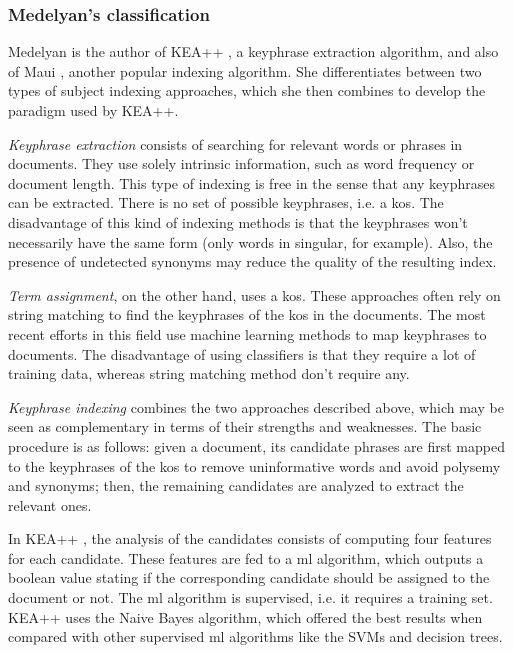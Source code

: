 \subsubsection{Medelyan's classification} \label{subject_indexing_medelyan}

Medelyan is the author of KEA++ \cite{medelyan2008domain}, a keyphrase extraction algorithm, and also of Maui \cite{medelyan2009human}, another popular indexing algorithm. She differentiates between two types of subject indexing approaches, which she then combines to develop the paradigm used by KEA++.

\textit{Keyphrase extraction} consists of searching for relevant words or phrases in documents. They use solely intrinsic information, such as word frequency or document length. This type of indexing is free in the sense that any keyphrases can be extracted. There is no set of possible keyphrases, i.e. a \acrshort{kos}. The disadvantage of this kind of indexing methods is that the keyphrases won't necessarily have the same form (only words in singular, for example). Also, the presence of undetected synonyms may reduce the quality of the resulting index.

\textit{Term assignment}, on the other hand, uses a \acrshort{kos}. These approaches often rely on string matching to find the keyphrases of the \acrshort{kos} in the documents. The most recent efforts in this field use machine learning methods to map keyphrases to documents. The disadvantage of using classifiers is that they require a lot of training data, whereas string matching method don't require any.

\textit{Keyphrase indexing} combines the two approaches described above, which may be seen as complementary in terms of their strengths and weaknesses. The basic procedure is as follows: given a document, its candidate phrases are first mapped to the keyphrases of the \acrshort{kos} to remove uninformative words and avoid polysemy and synonyms; then, the remaining candidates are analyzed to extract the relevant ones.

In KEA++ \cite{medelyan2008domain}, the analysis of the candidates consists of computing four features for each candidate. These features are fed to a \acrshort{ml} algorithm, which outputs a boolean value stating if the corresponding candidate should be assigned to the document or not. The \acrshort{ml} algorithm is supervised, i.e. it requires a training set. KEA++ uses the Naive Bayes algorithm, which offered the best results when compared with other supervised \acrshort{ml} algorithms like the SVMs and decision trees.
